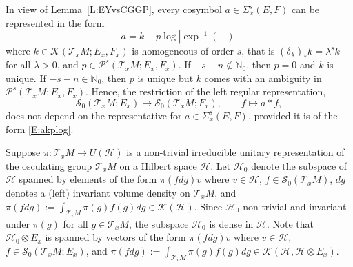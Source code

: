 \documentclass[reqno,12pt]{amsart}
\theoremstyle{plain}
\theoremstyle{definition}
\begin{document}
In view of Lemma~\ref{L:EYvsCGGP}, every cosymbol $a\in\Sigma_x^s(E,F)$ can be represented in the form
\begin{equation}\label{E:akplog}
a=k+p\log|\exp^{-1}(-)|
\end{equation}
where $k\in\mathcal K(\mathcal T_xM;E_x,F_x)$ is homogeneous of order $s$, that is $(\delta_\lambda)_*k=\lambda^sk$ for all $\lambda>0$, and $p\in\mathcal P^s(\mathcal T_xM;E_x,F_x)$.
If $-s-n\notin\mathbb N_0$, then $p=0$ and $k$ is unique.
If $-s-n\in\mathbb N_0$, then $p$ is unique but $k$ comes with an ambiguity in $\mathcal P^s(\mathcal T_xM;E_x,F_x)$.
Hence, the restriction of the left regular representation,
\begin{equation}\label{E:aS0}
\mathcal S_0(\mathcal T_xM;E_x)\to\mathcal S_0(\mathcal T_xM;F_x),\qquad f\mapsto a*f,
\end{equation}
does not depend on the representative for $a\in\Sigma^s_x(E,F)$, provided it is of the form \eqref{E:akplog}.


Suppose $\pi\colon\mathcal T_xM\to U(\mathcal H)$ is a non-trivial irreducible unitary representation of the osculating group $\mathcal T_xM$ on a Hilbert space $\mathcal H$.
Let $\mathcal H_0$ denote the subspace of $\mathcal H$ spanned by elements of the form $\pi(fdg)v$ where $v\in\mathcal H$, $f\in\mathcal S_0(\mathcal T_xM)$, $dg$ denotes a (left) invariant volume density on $\mathcal T_xM$, and $\pi(fdg):=\int_{\mathcal T_xM}\pi(g)f(g)dg\in\mathcal K(\mathcal H)$.
Since $\mathcal H_0$ non-trivial and invariant under $\pi(g)$ for all $g\in\mathcal T_xM$, the subspace $\mathcal H_0$ is dense in $\mathcal H$.
Note that $\mathcal H_0\otimes E_x$ is spanned by vectors of the form $\pi(fdg)v$ where $v\in\mathcal H$, $f\in\mathcal S_0(\mathcal T_xM;E_x)$, and $\pi(fdg):=\int_{\mathcal T_xM}\pi(g)f(g)dg\in\mathcal K(\mathcal H,\mathcal H\otimes E_x)$.
\end{document}
